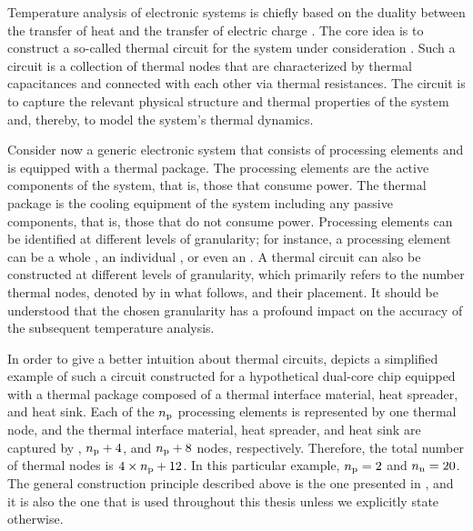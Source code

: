Temperature analysis of electronic systems is chiefly based on the duality
between the transfer of heat and the transfer of electric charge
\cite{kreith2000}. The core idea is to construct a so-called thermal 
circuit for the system under consideration \cite{skadron2003}. Such a circuit is
a collection of thermal nodes that are characterized by thermal capacitances and
connected with each other via thermal resistances. The circuit is to capture the
relevant physical structure and thermal properties of the system and, thereby,
to model the system's thermal dynamics.

Consider now a generic electronic system that consists of \nc processing
elements and is equipped with a thermal package. The processing elements are the
active components of the system, that is, those that consume power. The thermal
package is the cooling equipment of the system including any passive components,
that is, those that do not consume power. Processing elements can be identified
at different levels of granularity; for instance, a processing element can be a
whole , an individual , or even an . A thermal 
circuit can also be constructed at different levels of granularity, which
primarily refers to the number thermal nodes, denoted by \nn in what follows,
and their placement. It should be understood that the chosen granularity has a
profound impact on the accuracy of the subsequent temperature analysis.

In order to give a better intuition about thermal  circuits,
 depicts a simplified example of such a circuit
constructed for a hypothetical dual-core chip equipped with a thermal package
composed of a thermal interface material, heat spreader, and heat sink. Each of
the ${n_\mathrm{p}}$ processing elements is represented by one thermal node, and the
thermal interface material, heat spreader, and heat sink are captured by \nc,
${n_\mathrm{p}} + 4$, and ${n_\mathrm{p}} + 8$ nodes, respectively. Therefore, the total number of
thermal nodes \nn is $4 \times {n_\mathrm{p}} + 12$. In this particular example, ${n_\mathrm{p}} = 2$
and ${n_\mathrm{n}} = 20$. The general construction principle described above is the one
presented in \cite{huang2008}, and it is also the one that is used throughout
this thesis unless we explicitly state otherwise.

